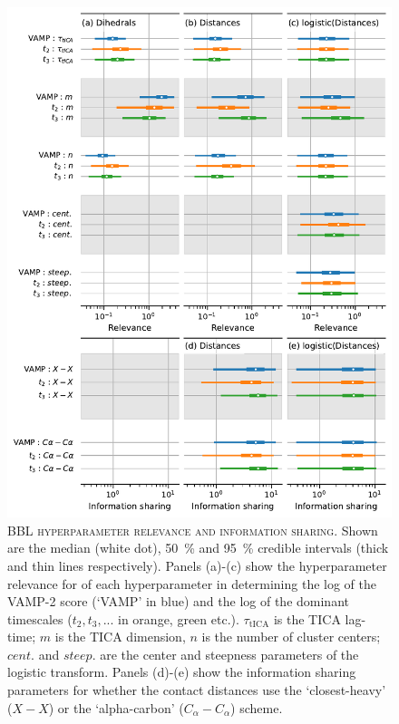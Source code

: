 \documentclass{article}
\begin{document}
\begin{figure}[h]
    \centering
    \includegraphics[height=0.8\textheight]{figures/sensitivities/2wav_sensitivity.pdf}
    \caption{\textsc{BBL hyperparameter relevance and information sharing}. Shown are the  median (white dot), \SI{50}{\percent} and \SI{95}{\percent} credible intervals (thick and thin lines respectively).  Panels (a)-(c) show the hyperparameter relevance for of each hyperparameter in determining the log of the VAMP-2 score (`VAMP' in blue) and the log of the dominant timescales ($t_{2}, t_{3}, ...$ in orange, green etc.). $\tau_{\mathrm{tICA}}$ is the TICA lag-time; $m$ is the TICA dimension, $n$ is the number of cluster centers; $cent.$ and $steep.$ are the center and steepness parameters of the logistic transform. Panels (d)-(e) show the information sharing parameters for whether the contact distances use the `closest-heavy' ($X-X$) or the `alpha-carbon' ($C_{\alpha}-C_{\alpha}$) scheme.  }
    \label{fig:2wav_sense}
\end{figure}
\end{document}
